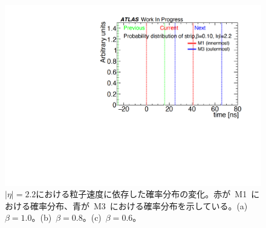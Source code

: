 \begin{figure}[H]
\begin{minipage}{0.33\hsize}
    \subcaption{}
    \end{minipage}
    \begin{minipage}{0.33\hsize}
    \centering   
    \includegraphics[width=\textwidth,page=7]{img/rec/rec_e2.2_s.pdf}
    \subcaption{}
    \end{minipage}
    \caption[$|\eta|=2.2$における粒子速度に依存した確率分布の変化]{$|\eta|=2.2$における粒子速度に依存した確率分布の変化。赤が~M1~における確率分布、青が~M3~における確率分布を示している。(a)~$\beta=1.0$。(b)~$\beta=0.8$。(c)~$\beta=0.6$。}\label{fig:recbeta1}
\end{figure}

